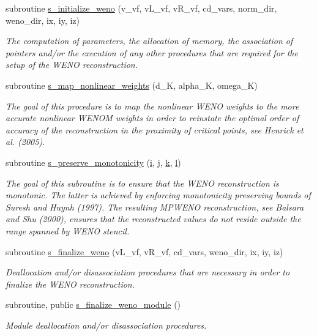 \begin{DoxyCompactItemize}
subroutine \hyperlink{namespacem__weno_aa2c34f80dbff64204b9fcf65a1bc137a}{s\+\_\+initialize\+\_\+weno} (v\+\_\+vf, v\+L\+\_\+vf, v\+R\+\_\+vf, cd\+\_\+vars, norm\+\_\+dir, weno\+\_\+dir, ix, iy, iz)
\begin{DoxyCompactList}\small\item\em The computation of parameters, the allocation of memory, the association of pointers and/or the execution of any other procedures that are required for the setup of the W\+E\+NO reconstruction. \end{DoxyCompactList}\item 
subroutine \hyperlink{namespacem__weno_a29eef65904f4b97e708c3ff282737937}{s\+\_\+map\+\_\+nonlinear\+\_\+weights} (d\+\_\+K, alpha\+\_\+K, omega\+\_\+K)
\begin{DoxyCompactList}\small\item\em The goal of this procedure is to map the nonlinear W\+E\+NO weights to the more accurate nonlinear W\+E\+N\+OM weights in order to reinstate the optimal order of accuracy of the reconstruction in the proximity of critical points, see Henrick et al. (2005). \end{DoxyCompactList}\item 
subroutine \hyperlink{namespacem__weno_afc956598e9b022de4638837cd2556546}{s\+\_\+preserve\+\_\+monotonicity} (\hyperlink{m__rhs_8f90_aaea4baed8fd8b780f6938f0dc1fb0f72}{i}, \hyperlink{m__rhs_8f90_aeadbc0ce9b66517f8fde156199772ec1}{j}, \hyperlink{m__rhs_8f90_af22c486581933c52df7d4aa306382074}{k}, \hyperlink{m__rhs_8f90_a2ac747380de0e6e5e11b01f4137fb75c}{l})
\begin{DoxyCompactList}\small\item\em The goal of this subroutine is to ensure that the W\+E\+NO reconstruction is monotonic. The latter is achieved by enforcing monotonicity preserving bounds of Suresh and Huynh (1997). The resulting M\+P\+W\+E\+NO reconstruction, see Balsara and Shu (2000), ensures that the reconstructed values do not reside outside the range spanned by W\+E\+NO stencil. \end{DoxyCompactList}\item 
subroutine \hyperlink{namespacem__weno_a8657e638f74f9aa565fd794dd0c18eb9}{s\+\_\+finalize\+\_\+weno} (v\+L\+\_\+vf, v\+R\+\_\+vf, cd\+\_\+vars, weno\+\_\+dir, ix, iy, iz)
\begin{DoxyCompactList}\small\item\em Deallocation and/or disassociation procedures that are necessary in order to finalize the W\+E\+NO reconstruction. \end{DoxyCompactList}\item 
subroutine, public \hyperlink{namespacem__weno_a2e2bca630c0e8e8afac63e905f23783c}{s\+\_\+finalize\+\_\+weno\+\_\+module} ()
\begin{DoxyCompactList}\small\item\em Module deallocation and/or disassociation procedures. \end{DoxyCompactList}\end{DoxyCompactItemize}
